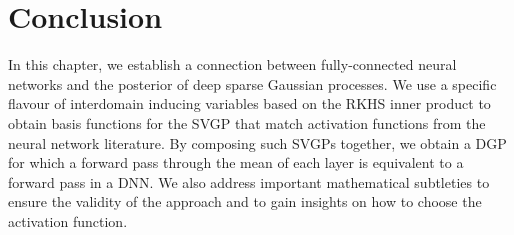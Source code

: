 \section{Conclusion}

In this chapter, we establish a connection between fully-connected neural networks and the posterior of deep sparse Gaussian processes. We use a specific flavour of interdomain inducing variables based on the RKHS inner product to obtain basis functions for the SVGP that match activation functions from the neural network literature. By composing such SVGPs together, we obtain a DGP for which a forward pass through the mean of each layer is equivalent to a forward pass in a DNN. We also address important mathematical subtleties to ensure the validity of the approach and to gain insights on how to choose the activation function. 
